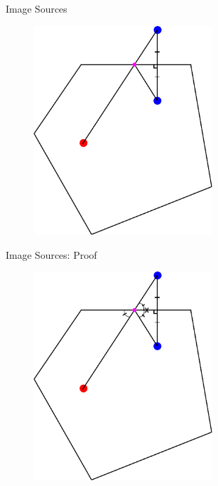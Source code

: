 \documentclass{beamer}
\begin{document}
\begin{frame}{Image Sources}

\begin{figure}[t]
	\centering
    \includegraphics[width=0.6\textwidth]{ImageSourcesDrawn2.pdf}
\end{figure}

\end{frame}

\begin{frame}{Image Sources: Proof}

\begin{figure}[t]
	\centering
    \includegraphics[width=0.6\textwidth]{ImageSourcesDrawn3Proof.pdf}
\end{figure}

\end{frame}
\end{document}
